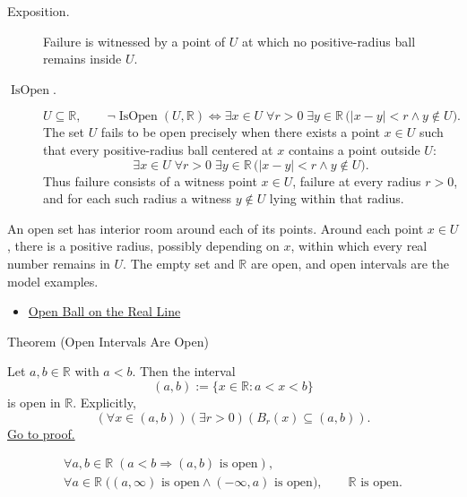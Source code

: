\begin{remark*}
\begin{description}
  \item[Exposition.]
  Failure is witnessed by a point of $U$ at which no positive-radius ball
  remains inside $U$.

  \item[\(\operatorname{IsOpen}.\)]
  \[
  U\subseteq\mathbb{R},\qquad
  \neg\operatorname{IsOpen}(U,\mathbb{R})
  \Longleftrightarrow
  \exists x\in U\;\forall r>0\;\exists y\in\mathbb{R}\,
  \bigl(|x-y|<r\land y\notin U\bigr).
  \]
  The set $U$ fails to be open precisely when there exists a point $x\in U$
  such that every positive-radius ball centered at $x$ contains a point outside
  $U$:
\[
\exists x\in U\;\forall r>0\;\exists y\in\mathbb{R}\,
\bigl(|x-y|<r\land y\notin U\bigr).
\]
  Thus failure consists of a witness point $x\in U$, failure at every radius
  $r>0$, and for each such radius a witness $y\notin U$ lying within that
  radius.
\end{description}
\end{remark*}
\begin{remark*}[Interpretation]
An open set has interior room around each of its points. Around each point
$x\in U$, there is a positive radius, possibly depending on $x$, within which
every real number remains in $U$. The empty set and $\mathbb{R}$ are open, and
open intervals are the model examples.
\end{remark*}
\begin{dependencies}
\begin{itemize}
  \item \hyperref[def:open-ball]{Open Ball on the Real Line}
\end{itemize}
\end{dependencies}
\begin{theorembox}{Theorem (Open Intervals Are Open)}
\begin{theorem}
\label{thm:open-interval-is-open}
Let $a,b\in\mathbb{R}$ with $a<b$.  Then the interval
\[
  (a,b):=\{x\in\mathbb{R}:a<x<b\}
\]
is open in $\mathbb{R}$.  Explicitly,
\[
  (\forall x\in(a,b))(\exists r>0)(B_r(x)\subseteq(a,b)).
\]
\hyperref[prf:open-interval-is-open]{Go to proof.}
\end{theorem}
\end{theorembox}
\begin{remark*}
\[
\begin{gathered}
\forall a,b\in\mathbb{R}\;(a<b\Longrightarrow (a,b)\text{ is open}),\\
\forall a\in\mathbb{R}\;\bigl((a,\infty)\text{ is open}\land(-\infty,a)\text{ is open}\bigr),
\qquad \mathbb{R}\text{ is open}.
\end{gathered}
\]
\end{remark*}

